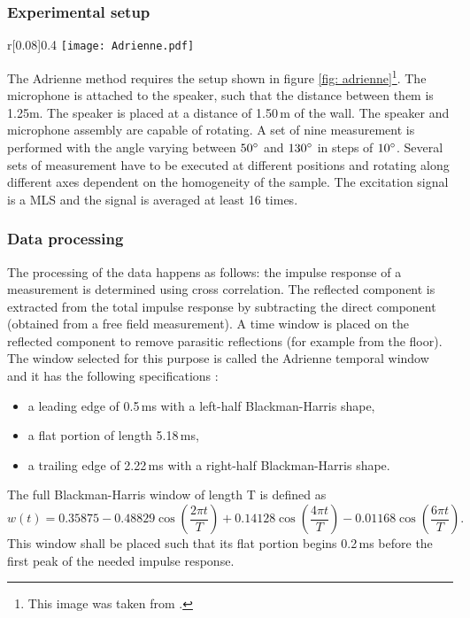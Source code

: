 \subsubsection{Experimental setup}

\begin{wrapfigure}{r}[0.08\textwidth]{0.4\textwidth}
	\vspace{-40pt}
  \centering
    \texttt{[image: Adrienne.pdf]}
  \caption{Setup for the reflection index measurements according to the Adrienne method.}
  \label{fig: adrienne}
  \vspace{-40pt}
\end{wrapfigure}
The Adrienne method requires the setup shown in figure \ref{fig: adrienne}\footnote{This image was taken from \cite[p.45]{Geetere}.}. The microphone is attached to the speaker, such that the distance between them is 1.25m. The speaker is placed at a distance of 1.50\,m of the wall. The speaker and microphone assembly are capable of rotating. A set of nine measurement is performed with the angle varying between $50^{\circ}$ and $130^{\circ}$ in steps of $10^{\circ}$.  Several sets of measurement have to be executed at different positions and rotating along different axes dependent on the homogeneity of the sample.
The excitation signal is a MLS and the signal is averaged at least 16 times.


\subsubsection{Data processing}\label{adrwindow}
The processing of the data happens as follows: the impulse response of a measurement is determined using cross correlation. The reflected component is extracted from the total impulse response by subtracting the direct component (obtained from a free field measurement). A time window is placed on the reflected component to remove parasitic reflections (for example from the floor). The window selected for this purpose is called the Adrienne temporal window and it has the following specifications \cite{Adrienne}:
\begin{itemize}
	\setlength{\itemsep}{1pt}
  \setlength{\parskip}{0pt}
  \setlength{\parsep}{0pt}
	\item a leading edge of 0.5\,ms with a left-half Blackman-Harris shape,
	\item a flat portion of length 5.18\,ms,
	\item a trailing edge of 2.22\,ms with a right-half Blackman-Harris shape.
\end{itemize}
The full Blackman-Harris window of length T is defined as 
\[
w(t) = 0.35875 - 0.48829 \cos(\frac{2 \pi t}{T}) + 0.14128 \cos(\frac{4 \pi t}{T}) - 0.01168 \cos(\frac{6 \pi t}{T}).
\]
This window shall be placed such that its flat portion begins 0.2\,ms before the first peak of the needed impulse response.

